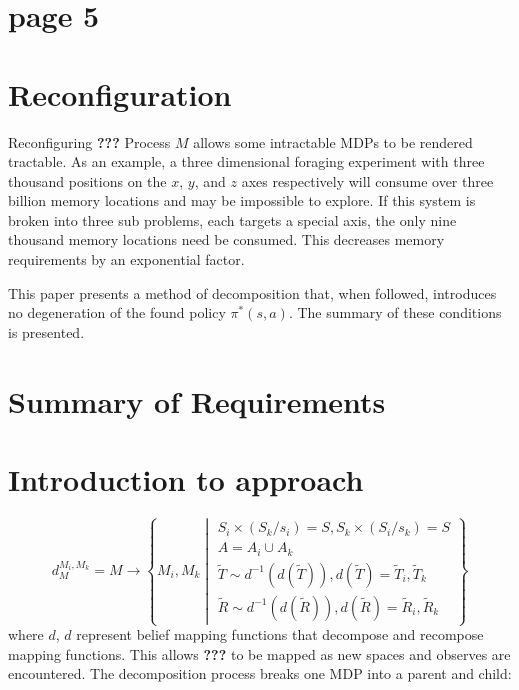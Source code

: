 \section*{page 5}

\section{Reconfiguration}

Reconfiguring \textbf{???} Process $M$ allows some intractable MDPs to be rendered tractable. 
As an example, a three dimensional foraging experiment with three thousand positions on the $x$, $y$, and $z$
axes respectively will consume over three billion memory locations and may be impossible to explore. If this system is
broken into three sub problems, each targets a special axis, the only nine thousand memory locations need be consumed. This decreases memory requirements by an exponential factor.

This paper presents a method of decomposition that, when followed, introduces no degeneration of the found policy $\pi^{*}(s,a)$.
The summary of these conditions is presented.

\section*{Summary of Requirements}

\section*{Introduction to approach}

\begin{equation*}
d^{M_i,M_k}_{M} = M \longrightarrow \left\{    M_i, M_k \middle|
\begin{array}{l}
S_i\times(S_k/s_i)=S, S_k\times(S_i/s_k)=S\\
A=A_i \cup A_k\\
\tilde{T}\sim d^{-1}(d(\tilde{T})),d(\tilde{T})=\tilde{T}_i, \tilde{T}_k\\
\tilde{R}\sim d^{-1}(d(\tilde{R})), d(\tilde{R})=\tilde{R}_i,\tilde{R}_k
\end{array}
 \right\}
\end{equation*}
where $d$, $d$ represent belief mapping functions that decompose and recompose mapping functions. This allows   \textbf{???} to be mapped as new spaces and observes are encountered. The decomposition process breaks one MDP into a parent and child:\\

\begin{center}
\end{center}
